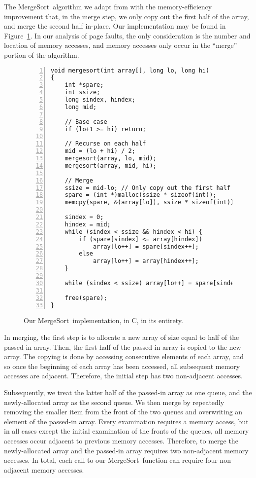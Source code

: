 \documentclass{acmtrans2m}
\newcommand{\mergesort}{{\sc MergeSort}}
\begin{document}
The \mergesort\ algorithm we adapt from  with the
memory-efficiency improvement that, in the merge step, we only copy out the
first half of the array, and merge the second half in-place.  Our
implementation may be found in Figure~\ref{fig:msort}.  In
our analysis of page faults, the only consideration is the number and location
of memory accesses, and memory accesses only occur in the ``merge'' portion of
the algorithm.

\begin{figure}
{\footnotesize
\begin{Verbatim}[numbers=left,numbersep=3pt,xleftmargin=20pt]
void mergesort(int array[], long lo, long hi)
{
    int *spare;
    int ssize;
    long sindex, hindex;
    long mid;

    // Base case
    if (lo+1 >= hi) return; 

    // Recurse on each half
    mid = (lo + hi) / 2;  
    mergesort(array, lo, mid);
    mergesort(array, mid, hi);

    // Merge
    ssize = mid-lo; // Only copy out the first half
    spare = (int *)malloc(ssize * sizeof(int));
    memcpy(spare, &(array[lo]), ssize * sizeof(int));

    sindex = 0;
    hindex = mid;
    while (sindex < ssize && hindex < hi) {
        if (spare[sindex] <= array[hindex])
            array[lo++] = spare[sindex++];
        else
            array[lo++] = array[hindex++];
    }

    while (sindex < ssize) array[lo++] = spare[sindex++];

    free(spare);
}
\end{Verbatim}
}

\caption{Our \mergesort\ implementation, in C, in its entirety.}
\label{fig:msort}
\end{figure}

In merging, the first step is to allocate a new array of size equal to half of
the passed-in array.  Then, the first half of the passed-in array is copied to
the new array.  The copying is done by accessing consecutive elements of each
array, and so once the beginning of each array has been accessed, all subsequent memory accesses are adjacent.  Therefore, the initial step has two non-adjacent accesses.

Subsequently, we treat the latter half of the passed-in array as one queue, and the newly-allocated array as the second queue.  We then merge by repeatedly removing the smaller item from the front of the two queues and overwriting an element of the passed-in array.  Every examination requires a memory access, but in all cases except the initial examination of the fronts of the queues, all memory accesses occur adjacent to previous memory accesses.  Therefore, to merge the newly-allocated array and the passed-in array requires two non-adjacent memory accesses.  In total, each call to our \mergesort\ function can require four non-adjacent memory accesses.
\end{document}
